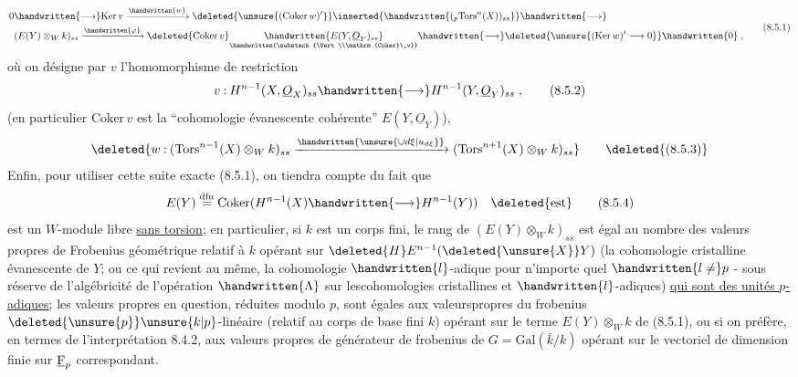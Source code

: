 \[
\begin{aligned}
0&\handwritten{\longrightarrow}\mathrm{Ker}\,v\xrightarrow{\handwritten{w}}\deleted{\unsure{(\mathrm{Coker}\,w)'}}\inserted{\handwritten{({}_p\mathrm{Tors}^{n}(X))_{ss}}}\handwritten{\longrightarrow}\\
&(E(Y)\otimes_W k)_{ss}\xrightarrow{\handwritten{\varphi}}
\deleted{\mathrm{Coker}\,v}\underset{\handwritten{\substack{\Vert\\\mathrm{Coker}\,v}}}{\handwritten{E(Y,\underline O_Y)_{ss}}}\handwritten{\longrightarrow}
\deleted{\unsure{(\mathrm{Ker}\,w)'\longrightarrow0}}\handwritten{0}\;,
\end{aligned}
\tag*{(8.5.1)}
\]
où on désigne par $v$ l'homomorphisme de restriction
\[
v\mathbin{:}H^{n-1}(X,\underline O_X)_{ss}\handwritten{\longrightarrow}H^{n-1}(Y,\underline O_Y)_{ss}\;,
\tag*{(8.5.2)}
\]
(en particulier $\mathrm{Coker}\,v$ est la ``cohomologie évanescente cohérente'' $E(Y,\underline O_Y)$), 
\[
\deleted{w\mathbin{:}(\mathrm{Tors}^{n-1}(X)\otimes_W k)_{ss}\xrightarrow{\handwritten{\unsure{\cup d\xi|u_{d\xi}}}}(\mathrm{Tors}^{n+1}(X)\otimes_W k)_{ss}}
\tag*{\deleted{(8.5.3)}}
\]
 Enfin, pour utiliser cette suite exacte (8.5.1), on tiendra compte du fait que
\[
E(Y)\overset{\rm dfn}{=}\mathrm{Coker}(H^{n-1}(X)\handwritten{\longrightarrow}H^{n-1}(Y))\quad\deleted{\text{est}}
\tag*{(8.5.4)}
\]
est un $W$-module libre \uline{sans torsion}; en particulier, si $k$ est un corps fini, le rang de $(E(Y)\otimes_W k)_{ss}$ est égal au nombre des valeurs propres de Frobenius géométrique relatif à $k$ opérant sur $\deleted{H}E^{n-1}(\deleted{\unsure{X}}Y)$ (la cohomologie cristalline évanescente de $Y$; ou ce qui revient au même, la cohomologie $\handwritten{l}$-adique pour n'importe quel $\handwritten{l\ne}p$ - sous réserve de l'algébricité de l'opération $\handwritten{\Lambda}$ sur lescohomologies cristallines et $\handwritten{l}$-adiques) \uline{qui sont des unités $p$-adiques}; les valeurs propres en question, réduites modulo $p$, sont égales aux valeurs\handwritten{\,}propres du frobenius $\deleted{\unsure{p}}\unsure{k|p}$-linéaire (relatif au corps de base fini $k$) opérant sur le terme $E(Y)\otimes_W k$ de (8.5.1), ou si on préfère, en termes de l'interprétation 8.4.2, aux valeurs propres de  générateur de frobenius de $G=\mathrm{Gal}(\bar k/k)$ opérant sur le vectoriel de dimension finie sur $\underline{\rm F}_p$ correspondant.


